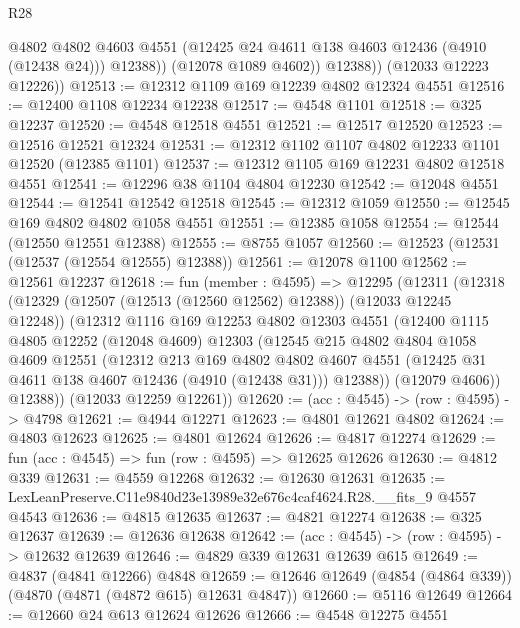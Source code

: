 \begin{lexlean}{R28}
\begin{coremodule}
                @4802
                @4802
                @4603
                @4551
                (@12425 @24 @4611 @138 @4603 @12436 (@4910 (@12438 @24)))
                @12388))
            (@12078 @1089 @4602))
          @12388))
      (@12033 @12223 @12226))
@12513 := @12312 @1109 @169 @12239 @4802 @12324 @4551
@12516 := @12400 @1108 @12234 @12238
@12517 := @4548 @1101
@12518 := @325 @12237
@12520 := @4548 @12518 @4551
@12521 := @12517 @12520
@12523 := @12516 @12521 @12324
@12531 := @12312 @1102 @1107 @4802 @12233 @1101 @12520 (@12385 @1101)
@12537 := @12312 @1105 @169 @12231 @4802 @12518 @4551
@12541 := @12296 @38 @1104 @4804 @12230
@12542 := @12048 @4551
@12544 := @12541 @12542 @12518
@12545 := @12312 @1059
@12550 := @12545 @169 @4802 @4802 @1058 @4551
@12551 := @12385 @1058
@12554 := @12544 (@12550 @12551 @12388)
@12555 := @8755 @1057
@12560 := @12523 (@12531 (@12537 (@12554 @12555) @12388))
@12561 := @12078 @1100
@12562 := @12561 @12237
@12618 := fun (member : @4595) =>
  @12295
    (@12311
      (@12318
        (@12329 (@12507 (@12513 (@12560 @12562) @12388)) (@12033 @12245 @12248))
        (@12312
          @1116
          @169
          @12253
          @4802
          @12303
          @4551
          (@12400
            @1115
            @4805
            @12252
            (@12048 @4609)
            @12303
            (@12545
              @215
              @4802
              @4804
              @1058
              @4609
              @12551
              (@12312
                @213
                @169
                @4802
                @4802
                @4607
                @4551
                (@12425 @31 @4611 @138 @4607 @12436 (@4910 (@12438 @31)))
                @12388))
            (@12079 @4606))
          @12388))
      (@12033 @12259 @12261))
@12620 := (acc : @4545) -> (row : @4595) -> @4798
@12621 := @4944 @12271
@12623 := @4801 @12621 @4802
@12624 := @4803 @12623
@12625 := @4801 @12624
@12626 := @4817 @12274
@12629 := fun (acc : @4545) => fun (row : @4595) => @12625 @12626
@12630 := @4812 @339
@12631 := @4559 @12268
@12632 := @12630 @12631
@12635 := LexLeanPreserve.C11e9840d23e13989e32e676c4caf4624.R28.__fits_9 @4557 @4543
@12636 := @4815 @12635
@12637 := @4821 @12274
@12638 := @325 @12637
@12639 := @12636 @12638
@12642 := (acc : @4545) -> (row : @4595) -> @12632 @12639
@12646 := @4829 @339 @12631 @12639 @615
@12649 := @4837 (@4841 @12266) @4848
@12659 := @12646 @12649 (@4854 (@4864 @339)) (@4870 (@4871 (@4872 @615) @12631 @4847))
@12660 := @5116 @12649
@12664 := @12660 @24 @613 @12624 @12626
@12666 := @4548 @12275 @4551

\end{coremodule}
\end{lexlean}
